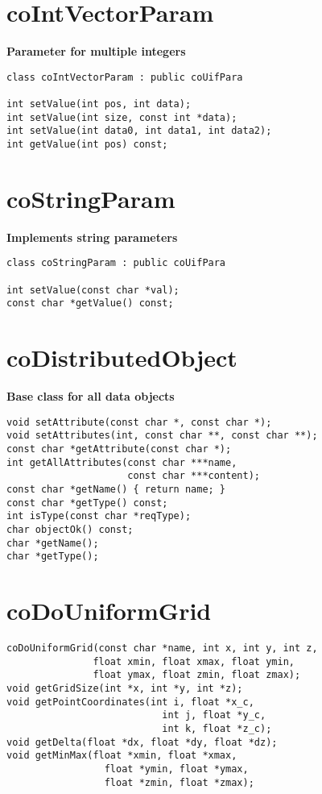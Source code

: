\section{coIntVectorParam}

{\bf Parameter for multiple integers}

\begin{verbatim}
class coIntVectorParam : public coUifPara
 
int setValue(int pos, int data);
int setValue(int size, const int *data);
int setValue(int data0, int data1, int data2);
int getValue(int pos) const;
\end{verbatim}


\section{coStringParam}

{\bf Implements string parameters}

\begin{verbatim}
class coStringParam : public coUifPara

int setValue(const char *val);
const char *getValue() const;
\end{verbatim}
 

\section{coDistributedObject}

{\bf Base class for all data objects}
 
\begin{verbatim}
void setAttribute(const char *, const char *);
void setAttributes(int, const char **, const char **);
const char *getAttribute(const char *);
int getAllAttributes(const char ***name,
                     const char ***content);
const char *getName() { return name; }
const char *getType() const;
int isType(const char *reqType);
char objectOk() const;
char *getName();
char *getType();
\end{verbatim}


\section{coDoUniformGrid}

\begin{verbatim} 
coDoUniformGrid(const char *name, int x, int y, int z,
               float xmin, float xmax, float ymin,
               float ymax, float zmin, float zmax);
void getGridSize(int *x, int *y, int *z);    
void getPointCoordinates(int i, float *x_c,
                           int j, float *y_c, 
                           int k, float *z_c);
void getDelta(float *dx, float *dy, float *dz);
void getMinMax(float *xmin, float *xmax,
                 float *ymin, float *ymax,
                 float *zmin, float *zmax);   
\end{verbatim}
 

